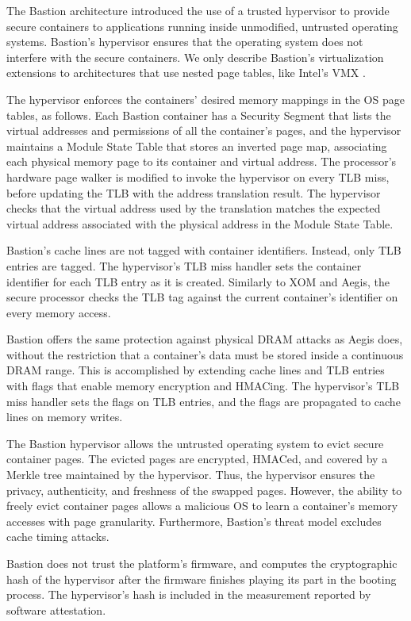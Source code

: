 
The Bastion architecture \cite{champagne2010bastion} introduced the use of a
trusted hypervisor to provide secure containers to applications running inside
unmodified, untrusted operating systems. Bastion's hypervisor ensures that the
operating system does not interfere with the secure containers. We only
describe Bastion's virtualization extensions to architectures that use nested
page tables, like Intel's VMX \cite{uhlig2005vmx}.

The hypervisor enforces the containers' desired memory mappings in the OS page
tables, as follows. Each Bastion container has a Security Segment that lists
the virtual addresses and permissions of all the container's pages, and the
hypervisor maintains a Module State Table that stores an inverted page map,
associating each physical memory page to its container and virtual address. The
processor's hardware page walker is modified to invoke the hypervisor on every
TLB miss, before updating the TLB with the address translation result. The
hypervisor checks that the virtual address used by the translation matches the
expected virtual address associated with the physical address in the Module
State Table.

Bastion's cache lines are not tagged with container identifiers. Instead, only
TLB entries are tagged. The hypervisor's TLB miss handler sets the container
identifier for each TLB entry as it is created. Similarly to XOM and Aegis, the
secure processor checks the TLB tag against the current container's identifier
on every memory access.

Bastion offers the same protection against physical DRAM attacks as Aegis does,
without the restriction that a container's data must be stored inside a
continuous DRAM range. This is accomplished by extending cache lines and TLB
entries with flags that enable memory encryption and HMACing. The hypervisor's
TLB miss handler sets the flags on TLB entries, and the flags are propagated to
cache lines on memory writes.

The Bastion hypervisor allows the untrusted operating system to evict secure
container pages. The evicted pages are encrypted, HMACed, and covered by a
Merkle tree maintained by the hypervisor. Thus, the hypervisor ensures the
privacy, authenticity, and freshness of the swapped pages. However, the ability
to freely evict container pages allows a malicious OS to learn a container's
memory accesses with page granularity. Furthermore, Bastion's threat model
excludes cache timing attacks.

Bastion does not trust the platform's firmware, and computes the cryptographic
hash of the hypervisor after the firmware finishes playing its part in the
booting process. The hypervisor's hash is included in the measurement reported
by software attestation.
